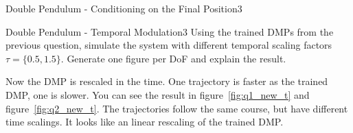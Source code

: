 \begin{questions}
\begin{question}{Double Pendulum - Conditioning on the Final Position}{3}
\end{question}


\begin{question}{Double Pendulum - Temporal Modulation}{3}
Using the trained DMPs from the previous question, simulate the system with different temporal scaling factors $\tau=\{0.5, 1.5\}$. Generate one figure per DoF and explain the result.

\begin{answer}
	
Now the DMP is rescaled in the time. One trajectory is faster as the trained DMP, one is slower. You can see the result in figure~\ref{fig:q1_new_t} and figure~\ref{fig:q2_new_t}. The trajectories follow the same course, but have different time scalings. It looks like an linear rescaling of the trained DMP.


\end{answer}
\end{question}
\end{questions}
